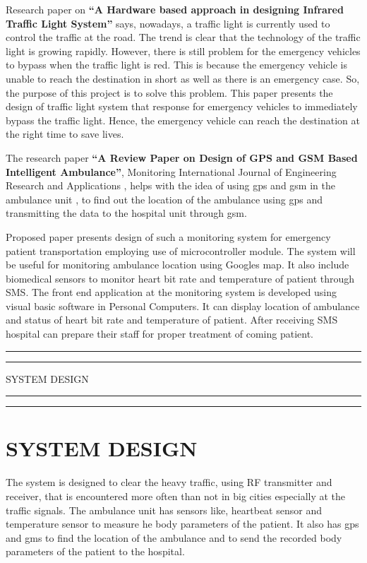 \documentclass[12pt,a4paper,oneside,openright]{report}
\begin{document}
Research paper on \textbf{“A Hardware based approach in designing Infrared Traffic Light System”} says, nowadays, a traffic light is currently used to control the traffic at the road. The trend is clear that the technology of the traffic light is growing rapidly. However, there is still problem for the emergency vehicles to bypass when the traffic light is red. This is because the emergency vehicle is unable to reach the destination in short as well as there is an emergency case. So, the purpose of this project is to solve this problem. This paper presents the design of traffic light system that response for emergency vehicles to immediately bypass the traffic light. Hence, the emergency vehicle can reach the destination at the right time to save lives. 

The research paper \textbf{“A  Review Paper on Design of GPS and GSM  Based  Intelligent Ambulance”}, Monitoring  International  Journal  of  Engineering Research  and  Applications  , helps with the idea of using gps and gsm in the ambulance unit , to find out the location of the ambulance using gps and transmitting the data to the hospital unit through gsm. 

Proposed paper presents design of such a monitoring system for emergency patient transportation employing use of microcontroller module. The system will be useful for monitoring ambulance location using Googles map. It also include biomedical sensors to monitor heart bit rate and temperature of patient through SMS. The front end application at the monitoring system is developed using visual basic software in Personal Computers. It can display location of ambulance and status of heart bit rate and temperature of patient. After receiving SMS hospital can prepare their staff for proper treatment of coming patient.


\newpage
\vspace*{\fill}
 \begin{center}
\hrule%
\vspace{1pt}%
\hrule
\vspace{1pc}%
\LARGE\MakeUppercase{SYSTEM  DESIGN} 
\vspace{1pc}%
\hrule%
\vspace{1pt}%
\hrule
 \end{center}
 \vspace*{\fill}

\chapter{SYSTEM  DESIGN}
The system is designed to clear the heavy traffic, using RF transmitter and receiver, that is encountered more often than not in big cities especially at the traffic signals. The ambulance unit has sensors like, heartbeat sensor and temperature sensor to measure he body parameters of the patient. It also has gps and gms to find the location of the ambulance and to send the recorded body parameters of the patient to the hospital.
\end{document}
